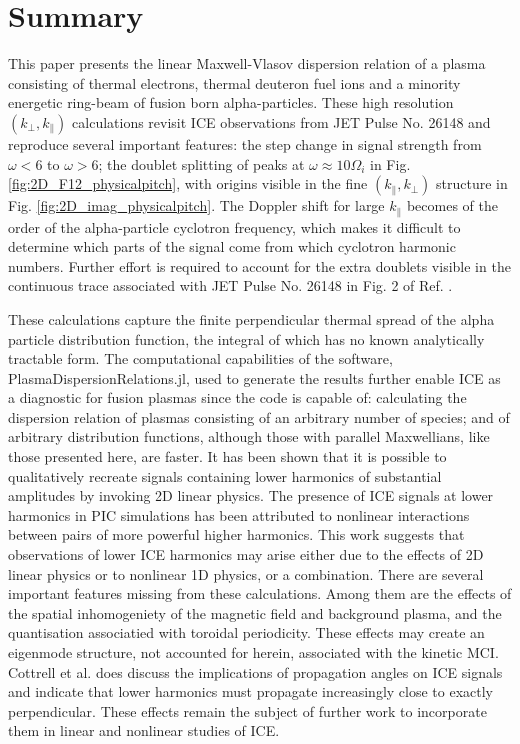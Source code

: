 \documentclass[12pt]{iopart}
\begin{document}
\section{Summary}

This paper presents the linear Maxwell-Vlasov dispersion relation of a plasma
consisting of thermal electrons, thermal deuteron fuel ions and a minority
energetic ring-beam of fusion born alpha-particles. These high resolution
$(k_\perp, k_\parallel)$ calculations revisit ICE observations from JET Pulse
No. 26148\cite{Cottrell1993,Dendy1995} and reproduce several important features:
the step change in signal strength from $\omega < 6$ to $\omega > 6$; the
doublet splitting of peaks at $\omega \approx 10\Omega_i$ in Fig.
\ref{fig:2D_F12_physicalpitch}, with origins visible in the fine $(k_\parallel,
k_\perp)$ structure in Fig. \ref{fig:2D_imag_physicalpitch}. The Doppler shift
for large $k_\parallel$ becomes of the order of the alpha-particle cyclotron
frequency, which makes it difficult to determine which parts of the signal come
from which cyclotron harmonic numbers. Further effort is required to account for
the extra doublets visible in the continuous trace associated with JET Pulse No.
26148 in Fig. 2 of Ref. \cite{Cottrell1993}.

These calculations capture the finite perpendicular thermal spread of the alpha
particle distribution function, the integral of which has no known analytically
tractable form. The computational capabilities of the software,
PlasmaDispersionRelations.jl, used to generate the results further enable ICE as
a diagnostic for fusion plasmas since the code is capable of: calculating the
dispersion relation of plasmas consisting of an arbitrary number of species; and
of arbitrary distribution functions, although those with parallel Maxwellians,
like those presented here, are faster. It has been shown that it is possible to
qualitatively recreate signals containing lower harmonics of substantial amplitudes by
invoking 2D linear physics. The presence of ICE signals at lower harmonics in
PIC simulations has been attributed to nonlinear interactions between pairs of
more powerful higher harmonics\cite{Carbajal2014}. This work suggests that
observations of lower ICE harmonics may arise either due to the effects of 2D
linear physics or to nonlinear 1D physics\cite{Chapman2018}, or a combination.
There are several important features missing from these calculations. Among them
are the effects of the spatial inhomogeniety of the magnetic field and background
plasma, and the quantisation associatied with toroidal periodicity. These
effects may create an eigenmode structure, not accounted for herein,
associated with the kinetic MCI.
Cottrell et al. \cite{Cottrell1993} does discuss the implications of propagation
angles on ICE signals and indicate that lower harmonics must propagate
increasingly close to exactly perpendicular. These effects remain the subject of
further work to incorporate them in linear and nonlinear studies of ICE.
\end{document}
